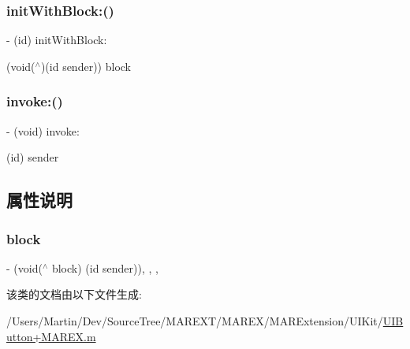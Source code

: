 \subsubsection{\texorpdfstring{init\+With\+Block\+:()}{initWithBlock:()}}
{\footnotesize\ttfamily -\/ (id) init\+With\+Block\+: \begin{DoxyParamCaption}\item[{(void($^\wedge$)(id sender))}]{block }\end{DoxyParamCaption}}

\mbox{\label{interface___m_a_r_u_i_button_target_a063398d170f9daa2681fde353cc6928b}} 
\subsubsection{\texorpdfstring{invoke\+:()}{invoke:()}}
{\footnotesize\ttfamily -\/ (void) invoke\+: \begin{DoxyParamCaption}\item[{(id)}]{sender }\end{DoxyParamCaption}}



\subsection{属性说明}
\mbox{\label{interface___m_a_r_u_i_button_target_ae91ea9fbd978756e94207dd93a2ee594}} 
\subsubsection{\texorpdfstring{block}{block}}
{\footnotesize\ttfamily -\/ (void($^\wedge$ block) (id sender))\hspace{0.3cm}{\ttfamily [read]}, {\ttfamily [write]}, {\ttfamily [nonatomic]}, {\ttfamily [copy]}}



该类的文档由以下文件生成\+:\begin{DoxyCompactItemize}
\item 
/\+Users/\+Martin/\+Dev/\+Source\+Tree/\+M\+A\+R\+E\+X\+T/\+M\+A\+R\+E\+X/\+M\+A\+R\+Extension/\+U\+I\+Kit/\hyperlink{_u_i_button_09_m_a_r_e_x_8m}{U\+I\+Button+\+M\+A\+R\+E\+X.\+m}\end{DoxyCompactItemize}
